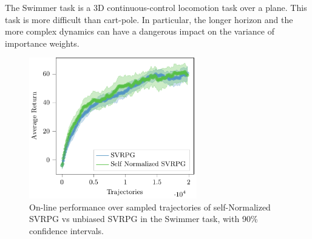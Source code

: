 \newpage
The Swimmer task is a 3D continuous-control locomotion task over a plane. This task is more difficult than cart-pole. In particular, the longer horizon and the more complex dynamics can have a dangerous impact on the variance of importance weights.

\begin{figure}[h]
	\begin{minipage}[h]{1\textwidth}
		\centering
		\includegraphics[width=0.65\textwidth]{Images/Experiments/swimmer_self_normalized_SVRPG_vs_SVRPG_tex.pdf}
		\vspace{-0.1in}
		\caption{On-line performance over sampled trajectories of self-Normalized \acs{SVRPG} vs unbiased \acs{SVRPG} in the Swimmer task, with 90\% confidence intervals.}
		\label{fig:swimmertwo}
	\end{minipage}
	\vspace{-0.15in}
\end{figure}

